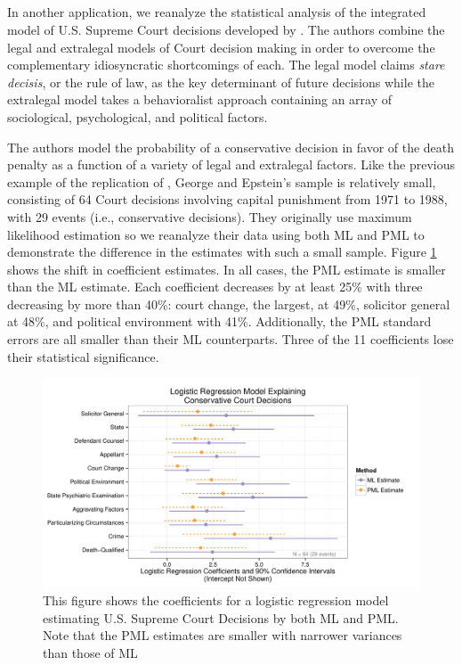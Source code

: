 \documentclass[12pt]{article}
\begin{document}
\subsection*{\cite{GeorgeEpstein1992}}

In another application, we reanalyze the statistical analysis of the integrated model of U.S. Supreme Court decisions developed by \cite{GeorgeEpstein1992}. 
The authors combine the legal and extralegal models of Court decision making in order to overcome the complementary idiosyncratic shortcomings of each. 
The legal model claims \emph{stare decisis}, or the rule of law, as the key determinant of future decisions while the extralegal model takes a behavioralist approach containing an array of sociological, psychological, and political factors. 

The authors model the probability of a conservative decision in favor of the death penalty as a function of a variety of legal and extralegal factors. 
Like the previous example of the replication of \cite{Weisiger2014}, George and Epstein's sample is relatively small, consisting of 64 Court decisions involving capital punishment from 1971 to 1988, with 29 events (i.e., conservative decisions). 
They originally use maximum likelihood estimation so we reanalyze their data using both ML and PML to demonstrate the difference in the estimates with such a small sample. 
Figure \ref{fig:ge-coefs} shows the shift in coefficient estimates. 
In all cases, the PML estimate is smaller than the ML estimate. 
Each coefficient decreases by at least 25\% with three decreasing by more than 40\%: court change, the largest, at 49\%, solicitor general at 48\%, and political environment with 41\%. 
Additionally, the PML standard errors are all smaller than their ML counterparts. 
Three of the 11 coefficients lose their statistical significance.

\begin{figure}[h]
\begin{center}
\includegraphics[width = \textwidth]{figs/ge-coefs.pdf}
\caption{This figure shows the coefficients for a logistic regression model estimating U.S. Supreme Court Decisions by both ML and PML. Note that the PML estimates are smaller with narrower variances than those of ML}\label{fig:ge-coefs}
\end{center}
\end{figure}
\end{document}
